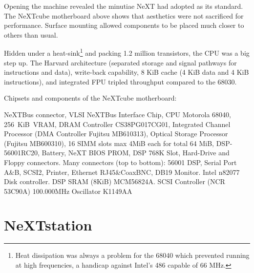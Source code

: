 \par
Opening the machine revealed the minutiae NeXT had adopted as its standard. The NeXTcube motherboard above shows that aesthetics were not sacrificed for performance. Surface mounting allowed components to be placed much closer to others than usual.\\
\par
Hidden under a heat-sink\footnote{Heat dissipation was always a problem for the 68040 which prevented running at high frequencies, a handicap against Intel's 486 capable of 66 MHz.} and packing 1.2 million transistors, the CPU was a big step up. The Harvard architecture (separated storage and signal pathways for instructions and data), write-back capability, 8 KiB cache (4 KiB data and 4 KiB instructions), and integrated FPU tripled throughput compared to the 68030.





\vspace{50 mm}
\par
Chipsets and components of the NeXTcube motherboard:\\
\par 
{} NeXTBus connector,
 VLSI NeXTBus Interface Chip,
 CPU Motorola 68040,
 256~KiB~VRAM,
 DRAM Controller CS38PG017CG01,
 Integrated Channel Processor (DMA Controller Fujitsu MB610313),
 Optical Storage Processor (Fujitsu MB600310),
 16 SIMM slots max 4MiB each for total 64 MiB,
 DSP-56001RC20,
 Battery,
 NeXT BIOS PROM,
 DSP 768K Slot,
 Hard-Drive and Floppy connectors.
 Many connectors (top to bottom): 56001 DSP, Serial Port A\&B, SCSI2, Printer, Ethernet RJ45\&CoaxBNC, DB19 Monitor. 
 Intel n82077 Disk controller.
 DSP SRAM (8KiB) MCM56824A.
 SCSI Controller (NCR 53C90A)
 100.000MHz Oscillator K1149AA






\section{NeXTstation}

